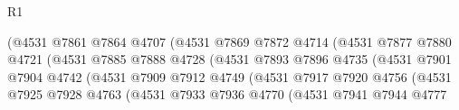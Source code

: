 \begin{lexlean}{R1}
\begin{coremodule}
                                          (@4531
                                            @7861
                                            @7864
                                            @4707
                                            (@4531
                                              @7869
                                              @7872
                                              @4714
                                              (@4531
                                                @7877
                                                @7880
                                                @4721
                                                (@4531
                                                  @7885
                                                  @7888
                                                  @4728
                                                  (@4531
                                                    @7893
                                                    @7896
                                                    @4735
                                                    (@4531
                                                      @7901
                                                      @7904
                                                      @4742
                                                      (@4531
                                                        @7909
                                                        @7912
                                                        @4749
                                                        (@4531
                                                          @7917
                                                          @7920
                                                          @4756
                                                          (@4531
                                                            @7925
                                                            @7928
                                                            @4763
                                                            (@4531
                                                              @7933
                                                              @7936
                                                              @4770
                                                              (@4531
                                                                @7941
                                                                @7944
                                                                @4777

\end{coremodule}
\end{lexlean}
